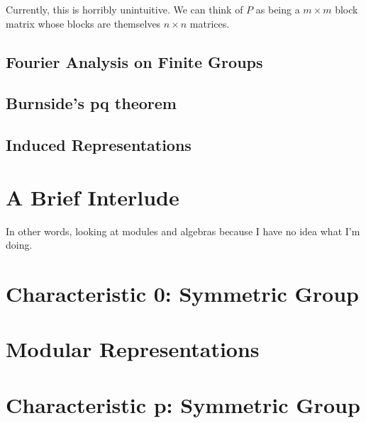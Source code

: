 \documentclass{article}
\begin{document}
\begin{note}
Currently, this is horribly unintuitive. We can think of $P$ as being a $m \times m$ block matrix whose blocks are themselves $n \times n$ matrices.
\end{note}





\subsection{Fourier Analysis on Finite Groups}

\subsection{Burnside's pq theorem}

\subsection{Induced Representations}

\section{A Brief Interlude}
In other words, looking at modules and algebras because I have no idea what I'm doing.

\section{Characteristic 0: Symmetric Group}


\section{Modular Representations}

\section{Characteristic p: Symmetric Group}
\end{document}

